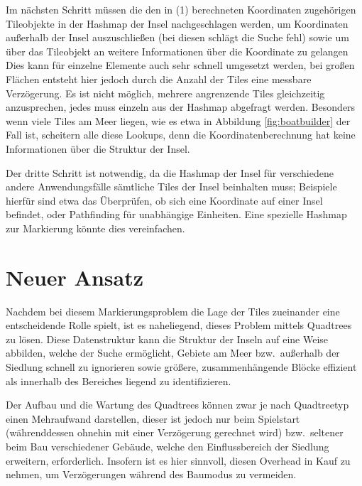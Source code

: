 \documentclass[%
			paper=a4,%
			DIV12,
			liststotoc,
			bibtotoc,
			draft=false,%
			titlepage,
			numbers=noendperiod
			]{scrartcl}
\begin{document}
Im nächsten Schritt müssen die den in (1) berechneten Koordinaten zugehörigen Tileobjekte in der Hashmap der Insel nachgeschlagen werden, um Koordinaten außerhalb der Insel auszuschließen (bei diesen schlägt die Suche fehl) sowie um über das Tileobjekt an weitere Informationen über die Koordinate zu gelangen 
Dies kann für einzelne Elemente auch sehr schnell umgesetzt werden, bei großen Flächen entsteht hier jedoch durch die Anzahl der Tiles eine messbare Verzögerung.
Es ist nicht möglich, mehrere angrenzende Tiles gleichzeitig anzusprechen, jedes muss einzeln aus der Hashmap abgefragt werden.
Besonders wenn viele Tiles am Meer liegen, wie es etwa in Abbildung \ref{fig:boatbuilder} der Fall ist, scheitern alle diese Lookups, denn die Koordinatenberechnung hat keine Informationen über die Struktur der Insel.

Der dritte Schritt ist notwendig, da die Hashmap der Insel für verschiedene andere Anwendungsfälle sämtliche Tiles der Insel beinhalten muss; Beispiele hierfür sind etwa das Überprüfen, ob sich eine Koordinate auf einer Insel befindet, oder Pathfinding für unabhängige Einheiten.
Eine spezielle Hashmap zur Markierung könnte dies vereinfachen.

\section{Neuer Ansatz}
Nachdem bei diesem Markierungsproblem die Lage der Tiles zueinander eine entscheidende Rolle spielt, ist es naheliegend, dieses Problem mittels Quadtrees zu lösen.
Diese Datenstruktur kann die Struktur der Inseln auf eine Weise abbilden,
welche der Suche ermöglicht, Gebiete am Meer bzw.\ außerhalb der Siedlung schnell zu ignorieren sowie größere, zusammenhängende Blöcke effizient als innerhalb des Bereiches liegend zu identifizieren.

Der Aufbau und die Wartung des Quadtrees können zwar je nach Quadtreetyp einen Mehraufwand darstellen, dieser ist jedoch nur beim Spielstart (währenddessen ohnehin mit einer Verzögerung gerechnet wird) bzw.\ seltener beim Bau verschiedener Gebäude, welche den Einflussbereich der Siedlung erweitern, erforderlich.
Insofern ist es hier sinnvoll, diesen Overhead in Kauf zu nehmen, um Verzögerungen während des Baumodus zu vermeiden.
\end{document}
